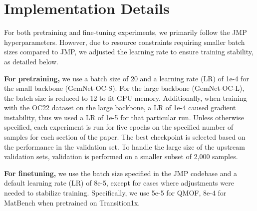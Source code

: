 \section{Implementation Details}
For both pretraining and fine-tuning experiments, we primarily follow the JMP hyperparameters. However, due to resource constraints requiring smaller batch sizes compared to JMP, we adjusted the learning rate to ensure training stability, as detailed below.

\textbf{For pretraining,} we use a batch size of 20 and a learning rate (LR) of 1e-4 for the small backbone (GemNet-OC-S). For the large backbone (GemNet-OC-L), the batch size is reduced to 12 to fit GPU memory. Additionally, when training with the OC22 dataset on the large backbone, a LR of 1e-4 caused gradient instability, thus we used a LR of 1e-5 for that particular run. Unless otherwise specified, each experiment is run for five epochs on the specified number of samples for each section of the paper. The best checkpoint is selected based on the performance in the validation set. To handle the large size of the upstream validation sets, validation is performed on a smaller subset of 2,000 samples.


\textbf{For finetuning,} we use the batch size specified in the JMP codebase and a default learning rate (LR) of 8e-5, except for cases where adjustments were needed to stabilize training. Specifically, we use 5e-5 for QMOF, 8e-4 for MatBench when pretrained on Transition1x. 

\clearpage

